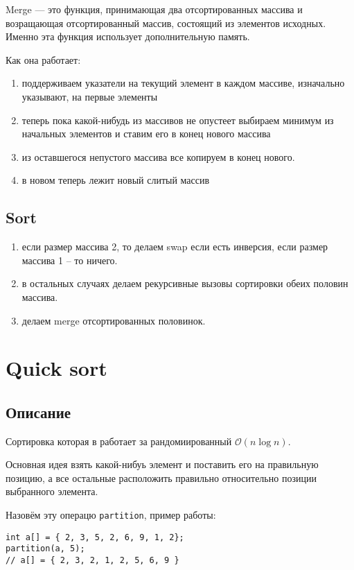 \documentclass[10pt,a4paper]{article}
\renewcommand{\O}{\mathcal{O}}
\begin{document}
Merge --- это функция, принимающая два отсортированных массива и возращающая
отсортированный массив, состоящий из элементов исходных. Именно эта функция 
использует дополнительную память.

Как она работает:
\begin{enumerate}
\item поддерживаем указатели на текущий элемент в каждом массиве, изначально 
указывают, на первые элементы 
\item теперь пока какой-нибудь из массивов не опустеет выбираем минимум из
начальных элементов и ставим его в конец нового массива
\item из оставшегося непустого массива все копируем в конец нового.
\item в новом теперь лежит новый слитый массив
\end{enumerate}

\subsection{Sort}

\begin{enumerate}
\item если размер массива 2, то делаем swap если есть инверсия, если размер 
массива 1 -- то ничего.
\item в остальных случаях делаем рекурсивные вызовы сортировки обеих половин массива.
\item делаем merge отсортированных половинок.
\end{enumerate}

\section{Quick sort}

\subsection{Описание}

Сортировка которая в работает за рандомиированный $\O(n \log n)$.

Основная идея взять какой-нибуь элемент и поставить его на правильную позицию, 
а все остальные расположить правильно относительно позиции выбранного элемента.

Назовём эту операцю \lstinline|partition|, пример работы:
\begin{lstlisting}
int a[] = { 2, 3, 5, 2, 6, 9, 1, 2};
partition(a, 5);
// a[] = { 2, 3, 2, 1, 2, 5, 6, 9 }
\end{lstlisting}
\end{document}
